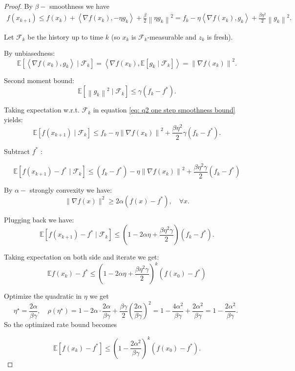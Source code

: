 \documentclass[en,hazy,blue,12pt,normal]{elegantnote}
\begin{document}
\begin{proof}
    By $\beta-$ smoothness we have 
    \begin{align}\label{eq: q2 one step smoothness bound}
        f\left(x_{k+1}\right) \leq f\left(x_k\right)+\left\langle\nabla f\left(x_k\right),-\eta g_k\right\rangle+\frac{\beta}{2}\left\|\eta g_k\right\|^2=f_k-\eta\left\langle\nabla f\left(x_k\right), g_k\right\rangle+\frac{\beta \eta^2}{2}\left\|g_k\right\|^2 .    
    \end{align}
    

    Let $\mathcal{F}_k$ be the history up to time $k$ (so $x_k$ is $\mathcal{F}_k$-measurable and $z_k$ is fresh).

    By unbiasedness:
    \[\mathbb{E}\left[\left\langle\nabla f\left(x_k\right), g_k\right\rangle \mid \mathcal{F}_k\right]=\left\langle\nabla f\left(x_k\right), \mathbb{E}\left[g_k \mid \mathcal{F}_k\right]\right\rangle=\left\|\nabla f\left(x_k\right)\right\|^2 .\]

    Second moment bound:
    \[\mathbb{E}\left[\left\|g_k\right\|^2 \mid \mathcal{F}_k\right] \leq \gamma\left(f_k-f^*\right) .\]

    Taking expectation w.r.t. $\mathcal{F}_k$ in equation \eqref{eq: q2 one step smoothness bound} yields:
    \[\mathbb{E}\left[f\left(x_{k+1}\right) \mid \mathcal{F}_k\right] \leq f_k-\eta\left\|\nabla f\left(x_k\right)\right\|^2+\frac{\beta \eta^2}{2} \gamma\left(f_k-f^*\right) .\]

    Subtract $f^*$ :

$$
\mathbb{E}\left[f\left(x_{k+1}\right)-f^* \mid \mathcal{F}_k\right] \leq\left(f_k-f^*\right)-\eta\left\|\nabla f\left(x_k\right)\right\|^2+\frac{\beta \eta^2 \gamma}{2}\left(f_k-f^*\right)
$$

By $\alpha-$ strongly convexity we have:
\[\|\nabla f(x)\|^2 \geq 2 \alpha\left(f(x)-f^*\right), \quad \forall x .\]

Plugging back we have:
\[\mathbb{E}\left[f\left(x_{k+1}\right)-f^* \mid \mathcal{F}_k\right] \leq\left(1-2 \alpha \eta+\frac{\beta \eta^2 \gamma}{2}\right)\left(f_k-f^*\right) .\]

Taking expectation on both side and iterate we get:\
\[\mathbb{E} f\left(x_k\right)-f^* \leq\left(1-2 \alpha \eta+\frac{\beta \eta^2 \gamma}{2}\right)^k\left(f\left(x_0\right)-f^*\right)\]

Optimize the quadratic in $\eta$ we get
\[\eta^{\star}=\frac{2 \alpha}{\beta \gamma},\quad \rho\left(\eta^{\star}\right)=1-2 \alpha \cdot \frac{2 \alpha}{\beta \gamma}+\frac{\beta \gamma}{2}\left(\frac{2 \alpha}{\beta \gamma}\right)^2=1-\frac{4 \alpha^2}{\beta \gamma}+\frac{2 \alpha^2}{\beta \gamma}=1-\frac{2 \alpha^2}{\beta \gamma} \text {. }\]
So the optimized rate bound becomes

$$
\mathbb{E}\left[f\left(x_k\right)-f^*\right] \leq\left(1-\frac{2 \alpha^2}{\beta \gamma}\right)^k\left(f\left(x_0\right)-f^*\right).
$$
\end{proof}
\end{document}
